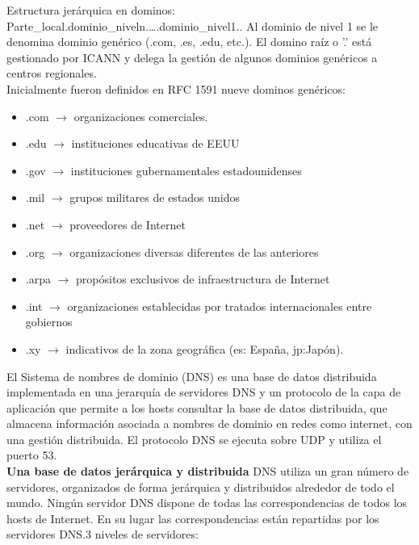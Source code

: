 \documentclass[a4paper,11pt]{article}
\begin{document}
Estructura jerárquica en dominos: Parte\_local.dominio\_niveln.\ldots.dominio\_nivel1.. Al dominio de nivel 1 se le denomina dominio genérico (.com, .es, .edu, etc.). El domino raíz o '.' está gestionado por ICANN y delega la gestión de algunos dominios genéricos a centros regionales. \\

Inicialmente fueron definidos en RFC 1591 nueve dominos genéricos:

\begin{itemize}
\item .com $\rightarrow$ organizaciones comerciales.
\item .edu $\rightarrow$ instituciones educativas de EEUU
\item .gov $\rightarrow$ instituciones gubernamentales estadounidenses
\item .mil $\rightarrow$ grupos militares de estados unidos
\item .net $\rightarrow$ proveedores de Internet
\item .org $\rightarrow$ organizaciones diversas diferentes de las anteriores
\item .arpa $\rightarrow$ propósitos exclusivos de infraestructura de Internet
\item .int $\rightarrow$ organizaciones establecidas por tratados internacionales entre gobiernos
\item .xy $\rightarrow$ indicativos de la zona geográfica (es: España, jp:Japón).
\end{itemize}

El Sistema de nombres de dominio (DNS) es una base de datos distribuida implementada en una jerarquía de servidores DNS y un protocolo de la capa de aplicación que permite a los hosts consultar la base de datos distribuida, que almacena información asociada a nombres de dominio en redes como internet, con una gestión distribuida. El protocolo DNS se ejecuta sobre UDP y utiliza el puerto 53. \\

\textbf{Una base de datos jerárquica y distribuida}
DNS utiliza un gran número de servidores, organizados de forma jerárquica y distribuidos alrededor de todo el mundo. Ningún servidor DNS dispone de todas las correspondencias de todos los hosts de Internet. En su lugar las correspondencias están repartidas por los servidores DNS.3 niveles de servidores:
\end{document}
